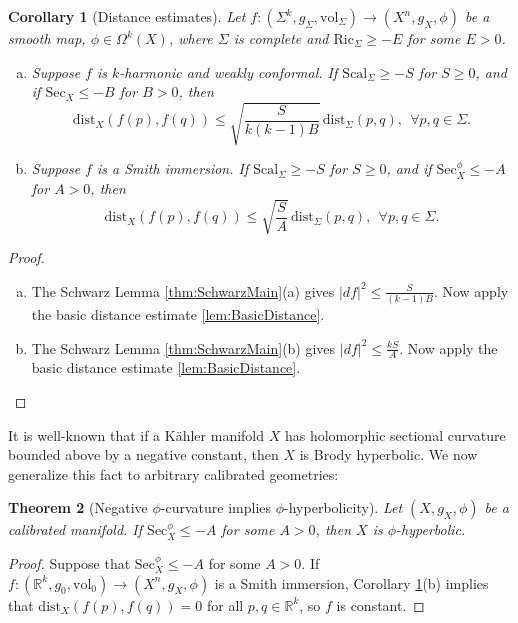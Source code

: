 \documentclass[11pt]{article}
\newcommand{\R}{\mathbb{R}}
\newcommand{\vol}{\mathrm{vol}}
\newtheorem{thm}{Theorem}[section]
\newtheorem{cor}[thm]{Corollary}
\theoremstyle{definition}
\numberwithin{equation}{section}
\begin{document}
\begin{cor}[Distance estimates] \label{thm:DistEst} Let $f \colon (\Sigma^k, g_\Sigma, \vol_\Sigma) \to (X^n, g_X, \phi)$ be a smooth map, $\phi \in \Omega^k(X)$, where $\Sigma$ is complete and $\mathrm{Ric}_\Sigma \geq -E$ for some $E > 0$.
\begin{enumerate}[(a)]
\item Suppose $f$ is $k$-harmonic and weakly conformal.  If $\mathrm{Scal}_\Sigma \geq -S$ for $S \geq 0$, and if $\mathrm{Sec}_X \leq -B$ for $B > 0$, then
$$\mathrm{dist}_X(f(p), f(q)) \leq \sqrt{ \frac{S}{k(k-1)B } }\,\mathrm{dist}_\Sigma(p,q), \ \ \forall p,q \in \Sigma.$$
\item Suppose $f$ is a Smith immersion.  If $\mathrm{Scal}_\Sigma \geq -S$ for $S \geq 0$, and if $\mathrm{Sec}^\phi_X \leq -A$ for $A > 0$, then
$$\mathrm{dist}_X(f(p), f(q)) \leq \sqrt{ \frac{S}{A} }\,\mathrm{dist}_\Sigma(p,q), \ \ \forall p,q \in \Sigma.$$
\end{enumerate}
\end{cor}

\begin{proof} ${}$
\begin{enumerate}[(a)]
\item The Schwarz Lemma \ref{thm:SchwarzMain}(a) gives $|df|^2 \leq \frac{S}{(k-1)B}$.  Now apply the basic distance estimate \ref{lem:BasicDistance}.
\item The Schwarz Lemma \ref{thm:SchwarzMain}(b) gives $|df|^2 \leq \frac{kS}{A}$.  Now apply the basic distance estimate \ref{lem:BasicDistance}.
\end{enumerate}
\end{proof}

\indent It is well-known that if a K\"{a}hler manifold $X$ has holomorphic sectional curvature bounded above by a negative constant, then $X$ is Brody hyperbolic.  We now generalize this fact to arbitrary calibrated geometries:

\begin{thm}[Negative $\phi$-curvature implies $\phi$-hyperbolicity] \label{cor:NegativeCurvature} Let $(X, g_X, \phi)$ be a calibrated manifold.  If $\mathrm{Sec}^\phi_X \leq -A$ for some $A > 0$, then $X$ is $\phi$-hyperbolic.
\end{thm}

\begin{proof} Suppose that $\mathrm{Sec}^\phi_X \leq -A$ for some $A > 0$.  If $f \colon (\R^k, g_0, \vol_0) \to (X^n, g_X, \phi)$ is a Smith immersion, Corollary \ref{thm:DistEst}(b) implies that $\mathrm{dist}_X(f(p), f(q)) = 0$ for all $p,q \in \R^k$, so $f$ is constant.
\end{proof}
\end{document}
